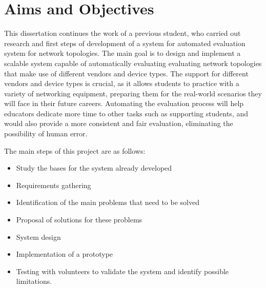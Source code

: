 \section{Aims and Objectives}
This dissertation continues the work of a previous student, who carried out research and first steps of development of a 
system for automated evaluation system for network topologies\cite{santos2024}. The main goal is to design and implement a scalable system 
capable of automatically evaluating evaluating network topologies that make use of different vendors and device types.
The support for different vendors and device types is crucial, as it allows students to practice with a variety of
networking equipment, preparing them for the real-world scenarios they will face in their future careers.
Automating the evaluation process will help educators dedicate more time to other tasks such as supporting students, and
would also provide a more consistent and fair evaluation, eliminating the possibility of human error.


The main steps of this project are as follows:

\begin{itemize}
    \item Study the bases for the system already developed
    \item Requirements gathering
    \item Identification of the main problems that need to be solved
    \item Proposal of solutions for these problems
    \item System design
    \item Implementation of a prototype
    \item Testing with volunteers to validate the system and identify possible limitations.
  \end{itemize}
